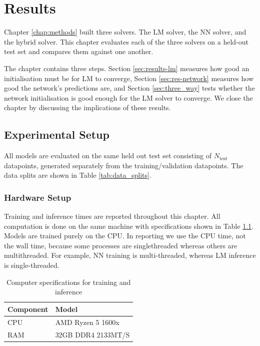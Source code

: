 \chapter{Results}\label{chap:results}

Chapter \ref{chap:methods} built three solvers. The LM solver, the NN solver, and the hybrid solver. This chapter evaluates each of the three solvers on a held-out test set and compares them against one another. 

The chapter contains three steps. Section \ref{sec:results-lm} measures how good an initialisation must be for LM to converge, Section \ref{sec:res-network} measures how good the network's predictions are, and Section \ref{sec:three_way} tests whether the network initialisation is good enough for the LM solver to converge. We close the chapter by discussing the implications of these results.

\section{Experimental Setup}
All models are evaluated on the same held out test set consisting of $N_{\mathrm{test}}$ datapoints, generated separately from the training/validation datapoints. The data splits are shown in Table \ref{tab:data_splits}.  


\subsection{Hardware Setup}
Training and inference times are reported throughout this chapter. All computation is done on the same machine with specifications shown in Table \ref{tab:comp_specs}. Models are trained purely on the CPU. In reporting we use the CPU time, not the wall time, because some processes are singlethreaded whereas others are multithreaded. For example, NN training is multi-threaded, whereas LM inference is single-threaded. 

\begin{table}
  \centering
  \begin{tabular}{ll}
    \toprule
    Component & Model \\
    \midrule
    CPU  & AMD Ryzen 5 1600x \\
    RAM  & 32GB DDR4 2133MT/S \\
    \bottomrule
  \end{tabular}
  \caption{Computer specifications for training and inference}
  \label{tab:comp_specs}
\end{table}

